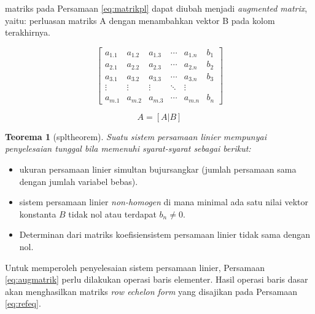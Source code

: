 \documentclass[
]{book}
\providecommand{\tightlist}{%
  \setlength{\itemsep}{0pt}\setlength{\parskip}{0pt}}
\newtheorem{theorem}{Teorema}[chapter]
\theoremstyle{definition}
\theoremstyle{definition}
\theoremstyle{definition}
\theoremstyle{definition}
\theoremstyle{remark}
\begin{document}
matriks pada Persamaan \eqref{eq:matrikpl} dapat diubah menjadi \emph{augmented matrix}, yaitu: perluasan matriks A dengan menambahkan vektor B pada kolom terakhirnya.

\begin{equation}
\begin{bmatrix}
     a_{1.1} & a_{1.2} & a_{1.3} &\cdots& a_{1.n} & b_1     \\[0.3em]
     a_{2.1} & a_{2.2} & a_{2.3} &\cdots& a_{2.n} & b_2     \\[0.3em]
     a_{3.1} & a_{3.2} & a_{3.3} &\cdots& a_{3.n} & b_3     \\[0.3em]
     \vdots  & \vdots  & \vdots &\ddots& \vdots            \\[0.3em]
     a_{m.1} & a_{m.2} & a_{m.3} &\cdots& a_{m.n} & b_n
     \end{bmatrix}
  \label{eq:augmatrik}
\end{equation}

\begin{equation}
A=\left[A|B\right]
  \label{eq:augmatrik2}
\end{equation}

\begin{theorem}[spltheorem]
\protect\hypertarget{thm:unnamed-chunk-25}{}\label{thm:unnamed-chunk-25}Suatu sistem persamaan linier mempunyai penyelesaian tunggal bila memenuhi syarat-syarat sebagai berikut:
\end{theorem}

\begin{itemize}
\tightlist
\item
  ukuran persamaan linier simultan bujursangkar (jumlah persamaan sama dengan jumlah variabel bebas).
\item
  sistem persamaan linier \emph{non-homogen} di mana minimal ada satu nilai vektor konstanta \(B\) tidak nol atau terdapat \(b_{n}\neq 0\).
\item
  Determinan dari matriks koefisiensistem persamaan linier tidak sama dengan nol.
\end{itemize}

Untuk memperoleh penyelesaian sistem persamaan linier, Persamaan \eqref{eq:augmatrik} perlu dilakukan operasi baris elementer. Hasil operasi baris dasar akan menghasilkan matriks \emph{row echelon form} yang disajikan pada Persamaan \eqref{eq:refeq}.
\end{document}
